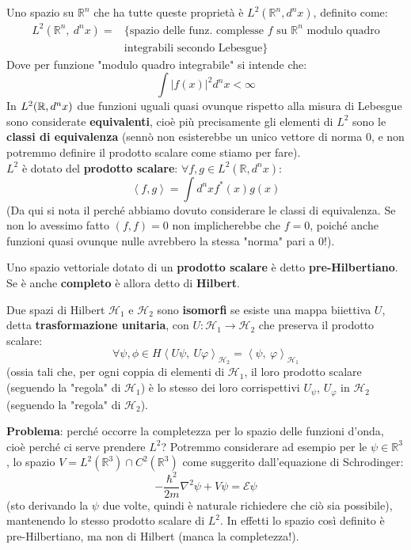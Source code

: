 \documentclass[FisicaTeorica.tex]{subfiles}
\begin{document}
Uno spazio su $\mathbb{R}^n$ che ha tutte queste proprietà è $L^2\left(\mathbb{R}^n,d^nx\right)$, definito come:
\begin{align*}
	L^2\left(\mathbb{R}^n,\ d^n x\right)= &\{\text{spazio delle funz. complesse $f$ su $\mathbb{R}^n$ modulo quadro}\\ &\text{integrabili secondo Lebesgue}\}
\end{align*}
Dove per funzione "modulo quadro integrabile" si intende che:
\[
	\int \left|f\left(x\right)\right|^2d^nx<\infty
\]
In $L^2(\mathbb{R}, d^n x)$ due funzioni uguali quasi ovunque rispetto alla misura di Lebesgue sono considerate \textbf{equivalenti}, cioè più precisamente gli elementi di $L^2$ sono le \textbf{classi di equivalenza} (sennò non esisterebbe un unico vettore di norma $0$, e non potremmo definire il prodotto scalare come stiamo per fare).\\
$L^2$ è dotato del \textbf{prodotto scalare}: $\forall f,g \in L^2\left(\mathbb{R},d^n x\right)$:
\[
	\left\langle f,g\right\rangle=\int d^n x f^*\left(x\right)g\left(x\right)
\]
(Da qui si nota il perché abbiamo dovuto considerare le classi di equivalenza. Se non lo avessimo fatto $\left(f,f\right)=0$ non implicherebbe che $f=0$, poiché anche funzioni quasi ovunque nulle avrebbero la stessa "norma" pari a $0$!).
\begin{dfn}
Uno spazio vettoriale dotato di un \textbf{prodotto scalare} è detto \textbf{pre-Hilbertiano}. Se è anche \textbf{completo} è allora detto di \textbf{Hilbert}.
\end{dfn}
\begin{dfn}
Due spazi di Hilbert $\mathcal{H}_1$ e $\mathcal{H}_2$ sono \textbf{isomorfi} se esiste una mappa biiettiva $U$, detta \textbf{trasformazione unitaria}, con $U:\mathcal{H}_1\rightarrow\mathcal{H}_2$ che preserva il prodotto scalare:
\[
	\forall \psi, \phi \in H \left\langle U\psi,\ U\varphi\right\rangle_{\mathcal{H}_2}=\left\langle\psi,\ \varphi\right\rangle_{\mathcal{H}_1}
\]
(ossia tali che, per ogni coppia di elementi di $\mathcal{H}_1$, il loro prodotto scalare (seguendo la "regola" di $\mathcal{H}_1$) è lo stesso dei loro corrispettivi $U_\psi$, $U_\varphi$ in $\mathcal{H}_2$ (seguendo la "regola" di $\mathcal{H}_2$).
\end{dfn}

\textbf{Problema}: perché occorre la completezza per lo spazio delle funzioni d'onda, cioè perché ci serve prendere $L^2$? Potremmo considerare ad esempio per le $\psi\in\mathbb{R}^3$, lo spazio $V=L^2\left(\mathbb{R}^3\right)\cap C^2(\mathbb{R}^3)$ come suggerito dall'equazione di Schrodinger:
\[
	-\frac{\hbar^2}{2m} \nabla^2 \psi+V\psi=\mathcal{E}\psi
\]
(sto derivando la $\psi$ due volte, quindi è naturale richiedere che ciò sia possibile), mantenendo lo stesso prodotto scalare di $L^2$. In effetti lo spazio così definito è pre-Hilbertiano, ma non di Hilbert (manca la completezza!).\\
\end{document}
